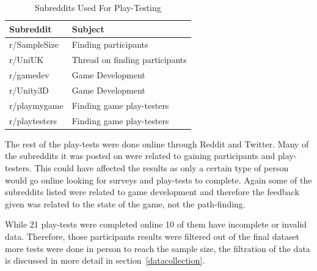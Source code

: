 \documentclass[journal]{IEEEtran}
\begin{document}
	\begin{table}[H]
		\centering
		\caption{Subreddits Used For Play-Testing}
		\label{table:Subreddits}
		\def\arraystretch{1.5}
		\begin{tabular}{ |l|l|}
			\hline
			\textbf{Subreddit}        & \textbf{Subject} \\     \hline
			r/SampleSize              & Finding participants  \\ \hline
			r/UniUK                   & Thread on finding participants \\ \hline
			r/gamedev                 & Game Development \\ \hline
			r/Unity3D                 & Game Development \\ \hline
			r/playmygame              & Finding game play-testers \\ \hline
			r/playtesters             & Finding game play-testers \\ \hline
		\end{tabular}
	\end{table}
	
	The rest of the play-tests were done online through Reddit and Twitter. Many of the subreddits it was posted on were related to gaining participants and play-testers. This could have affected the results as only a certain type of person would go online looking for surveys and play-tests to complete. Again some of the subreddits listed were related to game development and therefore the feedback given was related to the state of the game, not the path-finding.     
	
	While 21 play-tests were completed online 10 of them have incomplete or invalid data. Therefore, those participants results were filtered out of the final dataset more tests were done in person to reach the sample size, the filtration of the data is discussed in more detail in section~\ref{datacollection}.     
	
	
\end{document}
